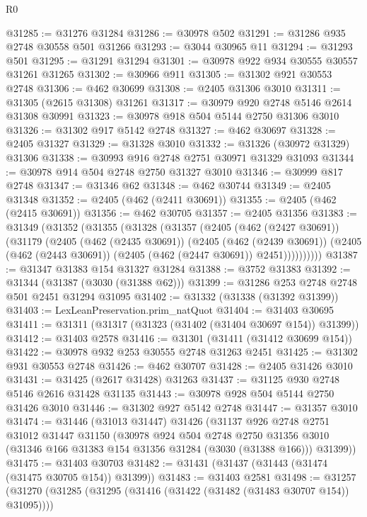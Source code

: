 \begin{lexlean}{R0}
\begin{coremodule}
@31285 := @31276 @31284
@31286 := @30978 @502
@31291 := @31286 @935 @2748 @30558 @501 @31266
@31293 := @3044 @30965 @11
@31294 := @31293 @501
@31295 := @31291 @31294
@31301 := @30978 @922 @934 @30555 @30557 @31261 @31265
@31302 := @30966 @911
@31305 := @31302 @921 @30553 @2748
@31306 := @462 @30699
@31308 := @2405 @31306 @3010
@31311 := @31305 (@2615 @31308) @31261
@31317 := @30979 @920 @2748 @5146 @2614 @31308 @30991
@31323 := @30978 @918 @504 @5144 @2750 @31306 @3010
@31326 := @31302 @917 @5142 @2748
@31327 := @462 @30697
@31328 := @2405 @31327
@31329 := @31328 @3010
@31332 := @31326 (@30972 @31329) @31306
@31338 := @30993 @916 @2748 @2751 @30971 @31329 @31093
@31344 := @30978 @914 @504 @2748 @2750 @31327 @3010
@31346 := @30999 @817 @2748
@31347 := @31346 @62
@31348 := @462 @30744
@31349 := @2405 @31348
@31352 := @2405 (@462 (@2411 @30691))
@31355 := @2405 (@462 (@2415 @30691))
@31356 := @462 @30705
@31357 := @2405 @31356
@31383 := @31349
    (@31352
      (@31355
        (@31328
          (@31357
            (@2405
              (@462 (@2427 @30691))
              (@31179
                (@2405
                  (@462 (@2435 @30691))
                  (@2405
                    (@462 (@2439 @30691))
                    (@2405 (@462 (@2443 @30691)) (@2405 (@462 (@2447 @30691)) @2451))))))))))
@31387 := @31347 @31383 @154 @31327 @31284
@31388 := @3752 @31383
@31392 := @31344 (@31387 (@3030 (@31388 @62)))
@31399 := @31286 @253 @2748 @2748 @501 @2451 @31294 @31095
@31402 := @31332 (@31338 (@31392 @31399))
@31403 := LexLeanPreservation.prim_natQuot
@31404 := @31403 @30695
@31411 := @31311 (@31317 (@31323 (@31402 (@31404 @30697 @154)) @31399))
@31412 := @31403 @2578
@31416 := @31301 (@31411 (@31412 @30699 @154))
@31422 := @30978 @932 @253 @30555 @2748 @31263 @2451
@31425 := @31302 @931 @30553 @2748
@31426 := @462 @30707
@31428 := @2405 @31426 @3010
@31431 := @31425 (@2617 @31428) @31263
@31437 := @31125 @930 @2748 @5146 @2616 @31428 @31135
@31443 := @30978 @928 @504 @5144 @2750 @31426 @3010
@31446 := @31302 @927 @5142 @2748
@31447 := @31357 @3010
@31474 := @31446
    (@31013 @31447)
    @31426
    (@31137
      @926
      @2748
      @2751
      @31012
      @31447
      @31150
      (@30978
        @924
        @504
        @2748
        @2750
        @31356
        @3010
        (@31346 @166 @31383 @154 @31356 @31284 (@3030 (@31388 @166)))
        @31399))
@31475 := @31403 @30703
@31482 := @31431 (@31437 (@31443 (@31474 (@31475 @30705 @154)) @31399))
@31483 := @31403 @2581
@31498 := @31257
    (@31270
      (@31285 (@31295 (@31416 (@31422 (@31482 (@31483 @30707 @154)) @31095))))

\end{coremodule}
\end{lexlean}
